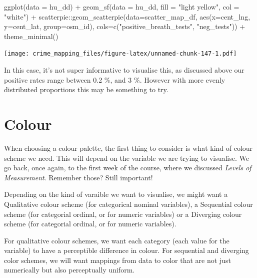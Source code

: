 \documentclass[
]{book}
\newenvironment{Shaded}{\begin{snugshade}}{\end{snugshade}}
\newcommand{\AttributeTok}[1]{\textcolor[rgb]{0.77,0.63,0.00}{#1}}
\newcommand{\FunctionTok}[1]{\textcolor[rgb]{0.00,0.00,0.00}{#1}}
\newcommand{\NormalTok}[1]{#1}
\newcommand{\SpecialCharTok}[1]{\textcolor[rgb]{0.00,0.00,0.00}{#1}}
\newcommand{\StringTok}[1]{\textcolor[rgb]{0.31,0.60,0.02}{#1}}
\begin{document}
\begin{Shaded}
\begin{Highlighting}[]
\FunctionTok{ggplot}\NormalTok{(}\AttributeTok{data =}\NormalTok{ hu\_dd) }\SpecialCharTok{+} 
  \FunctionTok{geom\_sf}\NormalTok{(}\AttributeTok{data =}\NormalTok{ hu\_dd, }\AttributeTok{fill =} \StringTok{"light yellow"}\NormalTok{, }\AttributeTok{col =} \StringTok{"white"}\NormalTok{) }\SpecialCharTok{+} 
\NormalTok{  scatterpie}\SpecialCharTok{::}\FunctionTok{geom\_scatterpie}\NormalTok{(}\AttributeTok{data=}\NormalTok{scatter\_map\_df, }\FunctionTok{aes}\NormalTok{(}\AttributeTok{x=}\NormalTok{cent\_lng, }\AttributeTok{y=}\NormalTok{cent\_lat, }\AttributeTok{group=}\NormalTok{osm\_id), }\AttributeTok{cols=}\FunctionTok{c}\NormalTok{(}\StringTok{"positive\_breath\_tests"}\NormalTok{, }\StringTok{"neg\_tests"}\NormalTok{)) }\SpecialCharTok{+} 
  \FunctionTok{theme\_minimal}\NormalTok{()}
\end{Highlighting}
\end{Shaded}

\texttt{[image: crime\_mapping\_files/figure-latex/unnamed-chunk-147-1.pdf]}

In this case, it's not super informative to visualise this, as discussed above our positive rates range between 0.2 \%, and 3 \%. However with more evenly distributed proportions this may be something to try.

\hypertarget{colour}{%
\section{Colour}\label{colour}}

When choosing a colour palette, the first thing to consider is what kind of colour scheme we need. This will depend on the variable we are trying to visualise. We go back, once again, to the first week of the course, where we discussed \emph{Levels of Measurement}. Remember those? Still important!

Depending on the kind of varaible we want to visualise, we might want a Qualitative colour scheme (for categorical nominal variables), a Sequential colour scheme (for categorial ordinal, or for numeric variables) or a Diverging colour scheme (for categorial ordinal, or for numeric variables).

For qualitative colour schemes, we want each category (each value for the variable) to have a perceptible difference in colour. For sequential and diverging color schemes, we will want mappings from data to color that are not just numerically but also perceptually uniform.
\end{document}
